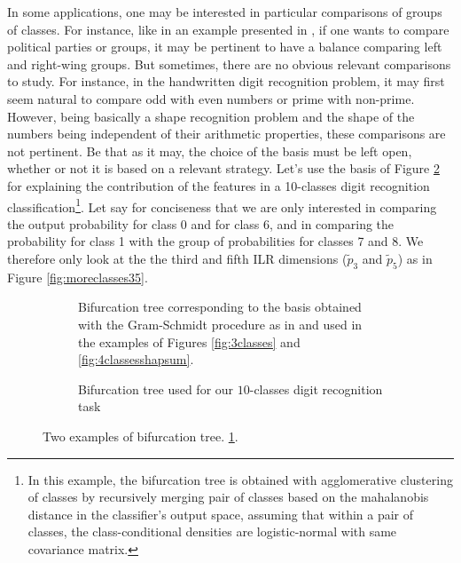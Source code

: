 \documentclass{article}
\theoremstyle{plain}
\theoremstyle{definition}
\theoremstyle{remark}
\begin{document}
In some applications, one may be interested in particular comparisons of groups of classes. For instance, like in an example presented in \cite{egozcue2005groups}, if one wants to compare political parties or groups, it may be pertinent to have a balance comparing left and right-wing groups. But sometimes, there are no obvious relevant comparisons to study. For instance, in the handwritten digit recognition problem, it may first seem natural to compare odd with even numbers or prime with non-prime. However, being basically a shape recognition problem and the shape of the numbers being independent of their arithmetic properties, these comparisons are not pertinent. Be that as it may, the choice of the basis must be left open, whether or not it is based on a relevant strategy. Let's use the basis of Figure \ref{fig:bifurc2} for explaining the contribution of the features in a 10-classes digit recognition classification\footnote{In this example, the bifurcation tree is obtained with agglomerative clustering of classes by recursively merging pair of classes based on the mahalanobis distance in the classifier's output space, assuming that within a pair of classes, the class-conditional densities are logistic-normal \cite{aitchison1980} with same covariance matrix.}. Let say for conciseness that we are only interested in comparing the output probability for class 0 and for class 6, and in comparing the probability for class 1 with the group of probabilities for classes 7 and 8. We therefore only look at the the third and fifth ILR dimensions ($\tilde{p}_3$ and $\tilde{p}_5$) as in Figure \ref{fig:moreclasses35}.


\begin{figure}
  \begin{subfigure}{0.5\textwidth}
    \centering
    
    \caption{Bifurcation tree corresponding to the basis obtained with the Gram-Schmidt procedure as in \cite{egozcue2003isometric} and used in the examples of Figures \ref{fig:3classes} and \ref{fig:4classesshapsum}.}
    \label{fig:bifurc1}
  \end{subfigure}

  \vspace{0.5cm}
  \begin{subfigure}{0.5\textwidth}
      \centering
      
      \caption{Bifurcation tree used for our $10$-classes digit recognition task}
      \label{fig:bifurc2}
    \end{subfigure}
  \caption{Two examples of bifurcation tree. \ref{fig:bifurc1}.}
  \label{fig:trees}
\end{figure}
\end{document}
